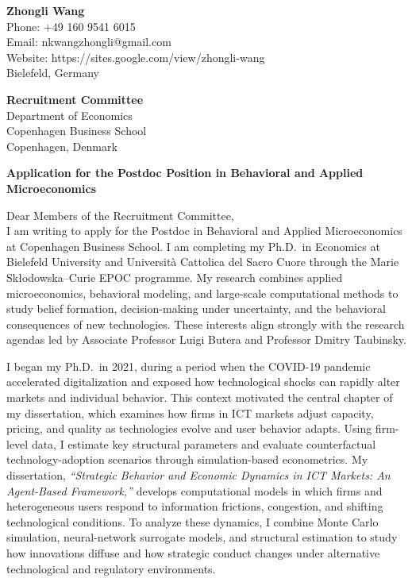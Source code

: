 \documentclass[11pt]{article}
\begin{document}
\noindent
\textbf{Zhongli Wang} \\
Phone: +49 160 9541 6015 \\
Email: nkwangzhongli@gmail.com \\
Website: https://sites.google.com/view/zhongli-wang \\
Bielefeld, Germany \\

\vspace{0.5cm}

\noindent
\textbf{Recruitment Committee} \\
Department of Economics \\
Copenhagen Business School \\
Copenhagen, Denmark \\

\vspace{0.5cm}

\noindent
\textbf{Application for the Postdoc Position in Behavioral and Applied Microeconomics} \\

\vspace{0.3cm}

\noindent Dear Members of the Recruitment Committee,\\[0.2cm]

I am writing to apply for the Postdoc in Behavioral and Applied Microeconomics at Copenhagen Business School. I am completing my Ph.D.\ in Economics at Bielefeld University and Università Cattolica del Sacro Cuore through the Marie Skłodowska–Curie EPOC programme. My research combines applied microeconomics, behavioral modeling, and large-scale computational methods to study belief formation, decision-making under uncertainty, and the behavioral consequences of new technologies. These interests align strongly with the research agendas led by Associate Professor Luigi Butera and Professor Dmitry Taubinsky.

I began my Ph.D.\ in 2021, during a period when the COVID-19 pandemic accelerated digitalization and exposed how technological shocks can rapidly alter markets and individual behavior. This context motivated the central chapter of my dissertation, which examines how firms in ICT markets adjust capacity, pricing, and quality as technologies evolve and user behavior adapts. Using firm-level data, I estimate key structural parameters and evaluate counterfactual technology-adoption scenarios through simulation-based econometrics. My dissertation, \textit{“Strategic Behavior and Economic Dynamics in ICT Markets: An Agent-Based Framework,”} develops computational models in which firms and heterogeneous users respond to information frictions, congestion, and shifting technological conditions. To analyze these dynamics, I combine Monte Carlo simulation, neural-network surrogate models, and structural estimation to study how innovations diffuse and how strategic conduct changes under alternative technological and regulatory environments.
\end{document}
